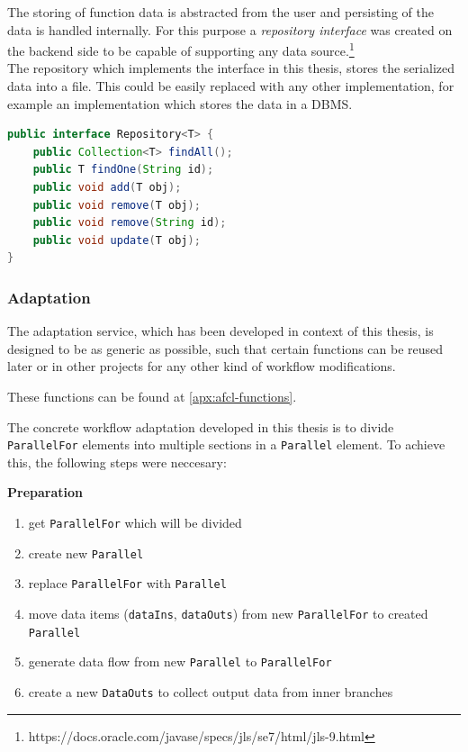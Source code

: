 \documentclass[a4paper,top=25mm,bottom=25mm,12pt,pdftex,halfparskip,twoside,bibtotoc,numbers=noenddot]{scrbook}
\begin{document}
The storing of function data is abstracted from the user and persisting of the data is handled internally. For this purpose a \textit{repository interface} was created on the backend side to be capable of supporting any data source.\footnote{https://docs.oracle.com/javase/specs/jls/se7/html/jls-9.html}\\
The repository which implements the interface in this thesis, stores the serialized data into a file. This could be easily replaced with any other implementation, for example an implementation which stores the data in a DBMS.


\begin{lstlisting}[language=Java, caption=Repository Interface]
public interface Repository<T> {
    public Collection<T> findAll();
    public T findOne(String id);
    public void add(T obj);
    public void remove(T obj);
    public void remove(String id);
    public void update(T obj);
}
\end{lstlisting}

\subsubsection{Adaptation}
The adaptation service, which has been developed in context of this thesis, is designed to be as generic as possible, such that certain functions can be reused later or in other projects for any other kind of workflow modifications. 

These functions can be found at \ref{apx:afcl-functions}.


%

The concrete workflow adaptation developed in this thesis is to divide \texttt{ParallelFor} elements into multiple sections in a \texttt{Parallel} element.
To achieve this, the following steps were neccesary:

\textbf{Preparation}
\begin{enumerate}
\item get \texttt{ParallelFor} which will be divided
\item create new \texttt{Parallel}
\item replace \texttt{ParallelFor} with \texttt{Parallel}
\item move data items (\texttt{dataIns}, \texttt{dataOuts}) from new \texttt{ParallelFor} to created \texttt{Parallel}
\item generate data flow from new \texttt{Parallel} to \texttt{ParallelFor}
\item create a new \texttt{DataOuts} to collect output data from inner branches
\end{enumerate}
\end{document}
